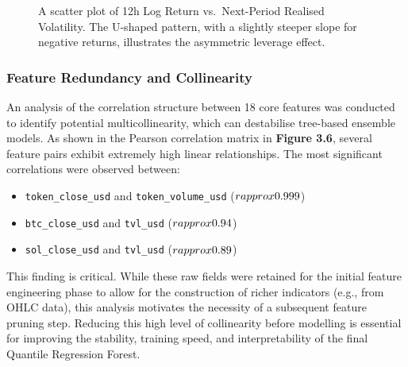 \documentclass[
  a4paper,
  DIV=11,
  numbers=noendperiod]{scrreprt}
\providecommand{\tightlist}{%
  \setlength{\itemsep}{0pt}\setlength{\parskip}{0pt}}
\begin{document}
\begin{figure}


\caption{\label{fig-leverage-effect}A scatter plot of 12h Log Return
vs.~Next-Period Realised Volatility. The U-shaped pattern, with a
slightly steeper slope for negative returns, illustrates the asymmetric
leverage effect.}

\end{figure}%

\subsubsection{Feature Redundancy and
Collinearity}\label{feature-redundancy-and-collinearity}

An analysis of the correlation structure between 18 core features was
conducted to identify potential multicollinearity, which can destabilise
tree-based ensemble models. As shown in the Pearson correlation matrix
in \textbf{Figure 3.6}, several feature pairs exhibit extremely high
linear relationships. The most significant correlations were observed
between:

\begin{itemize}
\tightlist
\item
  \texttt{token\_close\_usd} and \texttt{token\_volume\_usd}
  (\(r \\approx 0.999\))
\item
  \texttt{btc\_close\_usd} and \texttt{tvl\_usd} (\(r \\approx 0.94\))
\item
  \texttt{sol\_close\_usd} and \texttt{tvl\_usd} (\(r \\approx 0.89\))
\end{itemize}

This finding is critical. While these raw fields were retained for the
initial feature engineering phase to allow for the construction of
richer indicators (e.g., from OHLC data), this analysis motivates the
necessity of a subsequent feature pruning step. Reducing this high level
of collinearity before modelling is essential for improving the
stability, training speed, and interpretability of the final Quantile
Regression Forest.
\end{document}
